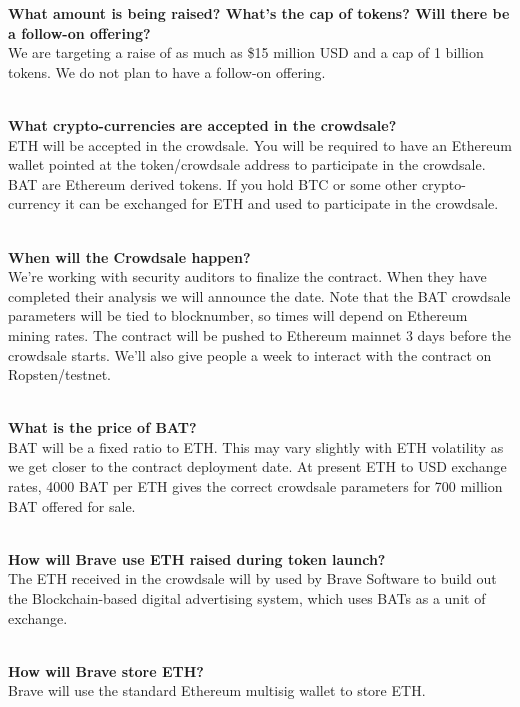 \documentclass[11pt]{article}
\begin{document}
\vbox{\textbf{What amount is being raised? What’s the cap of tokens? Will there be a follow-on offering?}\\
We are targeting a raise of as much as \$15 million USD and a cap of 1 billion tokens. We do not plan to have a follow-on offering. \\
\\
}

\vbox{\textbf{What crypto-currencies are accepted in the crowdsale?}\\
ETH will be accepted in the crowdsale. You will be required to have an Ethereum wallet pointed at the token/crowdsale address to participate in the crowdsale. \textrm{BAT} are Ethereum derived tokens. If you hold BTC or some other crypto-currency it can be exchanged for ETH and used to participate in the crowdsale.\\
\\
}

\vbox{\textbf{When will the Crowdsale happen?}\\
We're working with security auditors to finalize the contract. When they have completed their analysis we will announce the date. Note that the \textrm{BAT} crowdsale parameters will be tied to blocknumber, so times will depend on Ethereum mining rates. The contract will be pushed to Ethereum mainnet 3 days before the crowdsale starts. We'll also give people a week to interact with the contract on Ropsten/testnet.\\
\\
}

\vbox{\textbf{What is the price of BAT?}\\
BAT will be a fixed ratio to ETH. This may vary slightly with ETH volatility as we get closer to the contract deployment date. At present ETH to USD exchange rates, 4000 \textrm{BAT} per ETH gives the correct crowdsale parameters for 700 million \textrm{BAT} offered for sale.\\
\\
}

\vbox{\textbf{How will Brave use ETH raised during token launch? }\\
The ETH received in the crowdsale will by used by Brave Software to build out the Blockchain-based digital advertising system, which uses \textrm{BAT}s as a unit of exchange. \\ 
\\
}

\vbox{\textbf{How will Brave store ETH? }\\
Brave will use the standard Ethereum multisig wallet to store ETH. \\
\\
}
\end{document}
